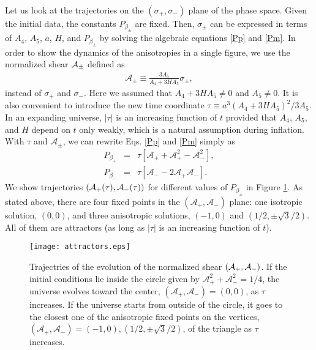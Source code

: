 \documentclass[aps,prd,preprint,superscriptaddress,nofootinbib,tightenlines]{revtex4-1}
\begin{document}
Let us look at the trajectories on the $(\sigma_+,\sigma_-)$ plane of
the phase space.
Given the initial data, the constants $P_{\beta_\pm}$ are fixed.
Then, $\sigma_\pm$ can be expressed in terms of $A_4$, $A_5$, $a$, $H$, and $P_{\beta_\pm}$
by
solving the algebraic equations \eqref{Pp} and \eqref{Pm}.
In order to show the dynamics of the anisotropies in a single figure,
we use the normalized shear ${\cal A}_\pm$ defined as
\begin{eqnarray}
\mathcal{A}_\pm \equiv \frac{ 3A_5 }{ A_4 + 3HA_5 }  \sigma_\pm ,
\end{eqnarray}
instead of $\sigma_+$ and $\sigma_-$. Here we
assumed that $A_4+3HA_5\ne 0$ and $A_5\ne 0$.
It is also convenient to introduce the new time coordinate
$\tau \equiv a^3 (A_4 + 3HA_5)^2 / 3A_5$.
In an expanding universe, $|\tau|$ is an increasing function of $t$
provided that $A_4$, $A_5$, and $H$ depend on $t$ only weakly,
which is a natural assumption during inflation.
With $\tau$ and $\mathcal{A}_\pm$, we can rewrite Eqs. \eqref{Pp} and \eqref{Pm}
simply as
\begin{eqnarray}
P_{\beta_+}
&=&
\tau
\left[
\mathcal{A}_+
+\mathcal{A}_+^2-\mathcal{A}_-^2
\right],\label{nPp}
 \\
P_{\beta_-}
&=&
\tau
\left[
\mathcal{A}_-
-2\mathcal{A}_+ \mathcal{A}_-
\right] . \label{nPm}
\end{eqnarray}
We show trajectories $({\cal A}_+(\tau), {\cal A}_-(\tau))$
for different values of $P_{\beta_\pm}$ in Figure \ref{attractors}.
As stated above,
there are four fixed points in the $(\mathcal{A}_+,\mathcal{A}_-)$ plane:
one isotropic solution, $(0,0)$, and three anisotropic solutions,
$(-1,0)$ and $(1/2,\pm \sqrt{3}/2)$. All of them
are attractors (as long as $|\tau|$ is an increasing function of $t$).




\begin{figure}[htbp]
  \begin{center}
       \texttt{[image: attractors.eps]}
       \caption{
       Trajectries of the evolution of the normalized shear $({\cal A}_+,{\cal A}_-)$.
       If the initial conditions lie inside the circle given by
       $\mathcal{A}_+^2+\mathcal{A}_-^2=1/4$,
       the universe evolves toward the center, $(\mathcal{A}_+,\mathcal{A}_-)=(0,0)$,
      as $\tau$ increases.
      If the universe starts from outside of the circle,
       it goes to the closest one of the anisotropic fixed points on the vertices,
       $(\mathcal{A}_+,\mathcal{A}_-)=(-1,0),(1/2,\pm \sqrt{3}/2)$, of the triangle as $\tau$ increases.
       }
       \label{attractors}
  \end{center}
\end{figure}
\end{document}
